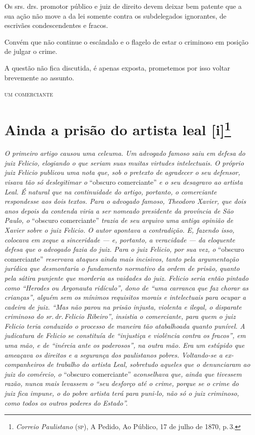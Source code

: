 Os srs. drs. promotor público e juiz de direito devem deixar bem patente
que a sua ação não move a da lei somente contra os subdelegados
ignorantes, de escrivães condescendentes e fracos.

Convém que não continue o escândalo e o flagelo de estar o criminoso em
posição de julgar o crime.

A questão não fica discutida, é apenas exposta, prometemos por isso
voltar brevemente ao assunto.

\begin{flushright}
\textsc{um comerciante}
\end{flushright}

\chapter{Ainda a prisão do artista leal {[}i{]}\footnote{\emph{Correio Paulistano} (\textsc{sp}), A Pedido, Ao Público,
  17 de julho de 1870, p.\,3.}} %

\begin{didascalia}
\emph{O primeiro artigo causou uma celeuma. Um advogado famoso saiu em
defesa do juiz Felicio, elogiando o que seriam suas muitas virtudes
intelectuais. O próprio juiz Felicio publicou uma nota que, sob o
pretexto de agradecer o seu defensor, visava tão só deslegitimar o}
``obscuro comerciante'' \emph{e o seu desagravo ao artista Leal. É natural
que na continuidade do artigo, portanto, o comerciante respondesse aos
dois textos. Para o advogado famoso, Theodoro Xavier, que dois anos
depois da contenda viria a ser nomeado presidente da província de São
Paulo, o} ``obscuro comerciante'' \emph{trazia de seu arquivo uma antiga
opinião de Xavier sobre o juiz Felicio. O autor apontava a contradição.
E, fazendo isso, colocava em xeque a sinceridade --- e, portanto, a
veracidade --- da eloquente defesa que o advogado fazia do juiz. Para o
juiz Felicio, por sua vez, o} ``obscuro comerciante'' \emph{reservava
ataques ainda mais incisivos, tanto pela argumentação jurídica que
desmontaria o fundamento normativo da ordem de prisão, quanto pela
sátira punjente que morderia as vaidades do juiz. Felicio seria então
pintado como ``Herodes ou Argonauta ridículo'', dono de ``uma carranca que
faz chorar as crianças'', alguém sem os mínimos requisitos morais e
intelectuais para ocupar a cadeira de juiz. ``Mas não parou na prisão
injusta, violenta e ilegal, o disparate criminoso do sr.\,dr.\,Felicio
Ribeiro'', insistia o comerciante, para quem o juiz Felicio teria
conduzido o processo de maneira tão atabalhoada quanto punível. A
judicatura de Felicio se constituía de ``injustiça e violência contra os
fracos'', em uma mão, e de ``inércia ante os poderosos'', na outra mão. Era
um estúpido que ameaçava os direitos e a segurança dos paulistanos
pobres. Voltando-se a ex-companheiros de trabalho do artista Leal,
sobretudo aqueles que o denunciaram ao juiz do comércio, o} ``obscuro
comerciante'' \emph{aconselhava que, ainda que tivessem razão, nunca mais
levassem o ``seu desforço até o crime, porque se o crime do juiz fica
impune, o do pobre artista terá para puni-lo, não só o juiz criminoso,
como todos os outros poderes do Estado''.}
\end{didascalia}

